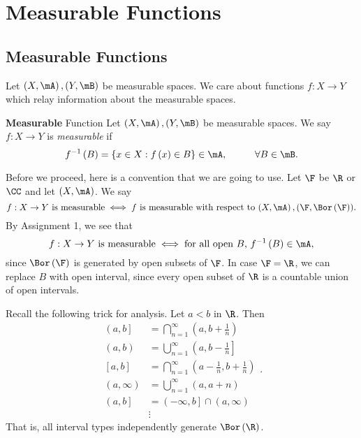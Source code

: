 \documentclass[pmath451]{subfiles}
\begin{document}
    \section{Measurable Functions}
    
    \subsection{Measurable Functions}
    
    Let $\left( X,\mA \right), \left( Y,\mB \right)$ be measurable spaces. We care about functions $f:X\to Y$ which relay information about the measurable spaces.

    \begin{definition}{\textbf{Measurable} Function}
        Let $\left( X,\mA \right), \left( Y,\mB \right)$ be measurable spaces. We say $f:X\to Y$ is \emph{measurable} if
        \begin{equation*}
            f^{-1}\left( B \right) = \left\lbrace x\in X: f\left( x \right)\in B \right\rbrace \in\mA,\hspace{1cm}\forall B\in\mB.
        \end{equation*}
    \end{definition}
    
    \np Before we proceed, here is a convention that we are going to use. Let $\F$ be $\R$ or $\CC$ and let $\left( X,\mA \right)$. We say 
    \begin{equation*}
        \text{$f:X\to Y$ is measurable} \iff \text{$f$ is measurable with respect to $\left( X,\mA \right),\left( \F,\Bor\left( \F \right) \right)$}.
    \end{equation*}
    By Assignment 1, we see that
    \begin{equation*}
        \text{$f:X\to Y$ is measurable} \iff \text{for all open $B$, $f^{-1}\left( B \right)\in\mA$},
    \end{equation*}
    since $\Bor\left( \F \right)$ is generated by open subsets of $\F$. In case $\F=\R$, we can replace $B$ with open interval, since every open subset of $\R$ is a countable union of open intervals.

    \np Recall the following trick for analysis. Let $a<b$ in $\R$. Then
    \begin{equation*}
        \begin{aligned}
            \left( a,b \right] & = \bigcap^{\infty}_{n=1} \left( a,b+\frac{1}{n} \right) \\
            \left( a,b \right) & = \bigcup^{\infty}_{n=1} \left( a,b-\frac{1}{n} \right] \\
            \left[ a,b \right] & = \bigcap^{\infty}_{n=1} \left( a-\frac{1}{n},b+\frac{1}{n} \right) \\
            \left( a,\infty \right) & = \bigcup^{\infty}_{n=1} \left( a,a+n \right) \\
            \left( a,b \right] & = \left( -\infty,b \right] \cap \left( a,\infty \right) \\
                               & \vdots
        \end{aligned} .
    \end{equation*}
    That is, all interval types independently generate $\Bor\left( \R \right)$.
\end{document}
